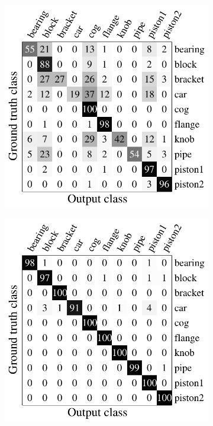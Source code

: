 \begin{figure}[ht]
\begin{subfigure}[t]{0.40\linewidth}
	\end{subfigure}
	\begin{subfigure}[t]{0.40\linewidth}
		\label{fig/reg/confusion_intrinsic}
		\includegraphics[width=1\linewidth]{fig/reg/confusion_intrinsic.pdf}
	\end{subfigure}
	\begin{subfigure}[t]{0.40\linewidth}
		\label{fig/reg/confusion_minent}
		\includegraphics[width=1\linewidth]{fig/reg/confusion_minent.pdf}

\end{subfigure}
\end{figure}
